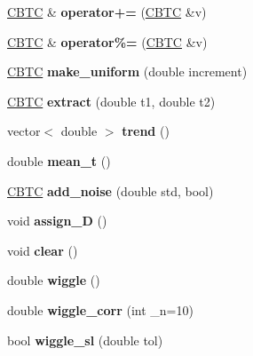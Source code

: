 \begin{DoxyCompactItemize}
\hyperlink{class_c_b_t_c}{C\+B\+TC} \& {\bfseries operator+=} (\hyperlink{class_c_b_t_c}{C\+B\+TC} \&v)
\item 
\mbox{\label{class_c_b_t_c_a59b6c14722cfbbd110bf1a7544e39cf3}} 
\hyperlink{class_c_b_t_c}{C\+B\+TC} \& {\bfseries operator\%=} (\hyperlink{class_c_b_t_c}{C\+B\+TC} \&v)
\item 
\mbox{\label{class_c_b_t_c_acae3bf4de4ee764941168bddfbfa2072}} 
\hyperlink{class_c_b_t_c}{C\+B\+TC} {\bfseries make\+\_\+uniform} (double increment)
\item 
\mbox{\label{class_c_b_t_c_a23114a888c7e9ffc8eda491bb068ab8f}} 
\hyperlink{class_c_b_t_c}{C\+B\+TC} {\bfseries extract} (double t1, double t2)
\item 
\mbox{\label{class_c_b_t_c_a1f7568711e04c6cfc314a9358410e200}} 
vector$<$ double $>$ {\bfseries trend} ()
\item 
\mbox{\label{class_c_b_t_c_a6fa1c43d1b2b32abc7ef21eb366721a7}} 
double {\bfseries mean\+\_\+t} ()
\item 
\mbox{\label{class_c_b_t_c_aa45843313e151c41fb886179b1c3c8e0}} 
\hyperlink{class_c_b_t_c}{C\+B\+TC} {\bfseries add\+\_\+noise} (double std, bool)
\item 
\mbox{\label{class_c_b_t_c_afa4e7d009712dd2af7a6ed3d6893e4de}} 
void {\bfseries assign\+\_\+D} ()
\item 
\mbox{\label{class_c_b_t_c_a68bd2207f5c9d4380927aedb68b05275}} 
void {\bfseries clear} ()
\item 
\mbox{\label{class_c_b_t_c_ab0e88138d90bd8c60a2559171cd33592}} 
double {\bfseries wiggle} ()
\item 
\mbox{\label{class_c_b_t_c_af0c01f85700d37b4151afd560d1e77fc}} 
double {\bfseries wiggle\+\_\+corr} (int \+\_\+n=10)
\item 
\mbox{\label{class_c_b_t_c_a323ae696cab005bde83b7fc75d26e8ca}} 
bool {\bfseries wiggle\+\_\+sl} (double tol)

\end{DoxyCompactItemize}
